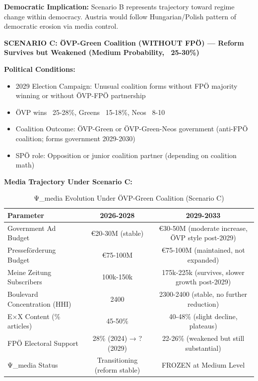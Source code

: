 \textbf{Democratic Implication:} Scenario B represents trajectory toward regime change within democracy.
Austria would follow Hungarian/Polish pattern of democratic erosion via media control.

\vspace{0.5cm}

\textbf{SCENARIO C: ÖVP-Green Coalition (WITHOUT FPÖ) — Reform Survives but Weakened (Medium Probability, ~25-30\%)}

\textbf{Political Conditions:}
\begin{itemize}
\item 2029 Election Campaign: Unusual coalition forms without FPÖ majority winning or without ÖVP-FPÖ partnership
\item ÖVP wins ~25-28\%, Greens ~15-18\%, Neos ~8-10%
\item Coalition Outcome: ÖVP-Green or ÖVP-Green-Neos government (anti-FPÖ coalition; forms government 2029-2030)
\item SPÖ role: Opposition or junior coalition partner (depending on coalition math)
\end{itemize}

\textbf{Media Trajectory Under Scenario C:}

\begin{table}[h]
\centering
\caption{Ψ_media Evolution Under ÖVP-Green Coalition (Scenario C)}
\label{tab:dx-scenario-c}
\begin{tabular}{|l|c|c|}
\hline
\textbf{Parameter} & \textbf{2026-2028} & \textbf{2029-2033} \\
\hline
Government Ad Budget & €20-30M (stable) & €30-50M (moderate increase, ÖVP style post-2029) \\
\hline
Presseförderung Budget & €75-100M & €75-100M (maintained, not expanded) \\
\hline
Meine Zeitung Subscribers & 100k-150k & 175k-225k (survives, slower growth post-2029) \\
\hline
Boulevard Concentration (HHI) & 2400 & 2300-2400 (stable, no further reduction) \\
\hline
E×X Content (\% articles) & 45-50\% & 40-48\% (slight decline, plateaus) \\
\hline
FPÖ Electoral Support & 28\% (2024) → ? (2029) & 22-26\% (weakened but still substantial) \\
\hline
Ψ_media Status & Transitioning (reform stable) & FROZEN at Medium Level \\
\hline
\end{tabular}
\end{table}

